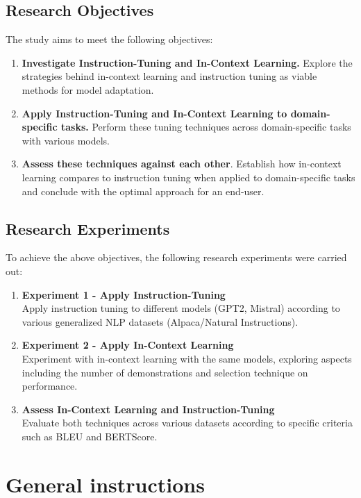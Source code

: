 \documentclass[11pt,a4paper]{article}
\begin{document}
\subsection{Research Objectives}
The study aims to meet the following objectives:
\begin{enumerate}
  \item \textbf{Investigate Instruction-Tuning and In-Context Learning.} Explore the strategies behind in-context learning and instruction tuning as viable methods for model adaptation. 
  \item \textbf{Apply Instruction-Tuning and In-Context Learning to domain-specific tasks.} Perform these tuning techniques across domain-specific tasks with various models.
  \item \textbf{Assess these techniques against each other}. Establish how in-context learning compares to instruction tuning when applied to domain-specific tasks and conclude with the optimal approach for an end-user.
\end{enumerate}

\subsection{Research Experiments}
To achieve the above objectives, the following research experiments were carried out:
\begin{enumerate}
  \item \textbf{Experiment 1 - Apply Instruction-Tuning}\\Apply instruction tuning to different models (GPT2, Mistral) according to various generalized NLP datasets (Alpaca/Natural Instructions).
  \item \textbf{Experiment 2 - Apply In-Context Learning}\\Experiment with in-context learning with the same models, exploring aspects including the number of demonstrations and selection technique 
  on performance. 
  \item \textbf{Assess In-Context Learning and Instruction-Tuning}\\Evaluate both techniques across various datasets according to specific criteria such as BLEU and BERTScore. 
\end{enumerate}


\fi


\section{General instructions}
\end{document}
